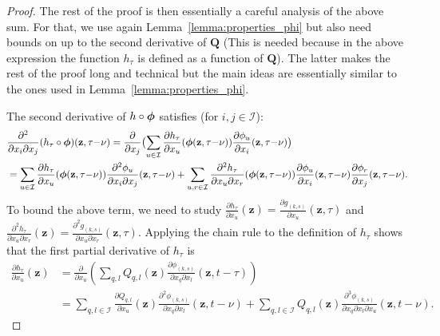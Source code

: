 \documentclass[acmsmall]{acmart}
\newcommand\bz{\mathbf{z}}
\newcommand\bphi{\text{\boldmath$\phi$}}
\newcommand\bQ{\mathbf{Q}}
\newcommand\calI{\mathcal{I}}
\begin{document}
\begin{proof}
The rest of the proof is then essentially a careful analysis of the above sum. For that, we use again Lemma~\ref{lemma:properties_phi} but also need bounds on up to the second derivative of $\bQ$ (This is needed because in the above expression the function $h_\tau$ is defined as a function of $\bQ$).  The latter makes the rest of the proof long and technical but the main ideas are essentially similar to the ones used in Lemma~\ref{lemma:properties_phi}. 

\medskip

The second derivative of $h\circ \bphi$ satisfies (for $i,j\in\calI$):
\begin{align}
& \frac{\partial^2}{\partial x_i \partial x_j} (h_\tau \circ \bphi)(\bz,\tau{-}\nu) = 
\frac{\partial}{\partial x_j} \bigl( \sum_{u \in \calI} \frac{\partial h_\tau}{\partial x_u}(\bphi (\bz, \tau{-}\nu)) \frac{\partial \phi_u}{\partial x_i}(\bz,\tau{-}\nu) \bigr) \nonumber\\
& = \sum_{u \in \calI} \frac{\partial h_\tau}{\partial x_u}(\bphi (\bz, \tau{-}\nu))\frac{\partial^2 \phi_u}{\partial x_i \partial x_j}(\bz,\tau{-}\nu) + \sum_{u, r \in \calI} \frac{\partial^2 h_\tau}{\partial x_u \partial x_r}(\bphi (\bz, \tau{-}\nu)) \frac{\partial \phi_u}{\partial x_i}(\bz,\tau{-}\nu) \frac{\partial \phi_r}{\partial x_j}(\bz,\tau{-}\nu) \label{eq:partial_deriv_g_ks}.
\end{align}
To bound the above term, we need to study $\frac{\partial h_\tau}{\partial x_u}(\bz) = \frac{\partial g_{(k,s)}}{\partial x_u}(\bz,\tau)$ and $\frac{\partial^2 h_\tau}{\partial x_u \partial x_r}(\bz) = \frac{\partial^2 g_{(k,s)}}{\partial x_u \partial x_r}(\bz,\tau)$. Applying the chain rule to the definition of $h_\tau$ shows that the first partial derivative of $h_\tau$ is
\begin{align*}
  \frac{\partial h_\tau}{\partial x_u}(\bz) & = \frac{\partial }{\partial x_u}\left( \sum_{q, l} Q_{q,l}(\bz)\frac{\partial \phi_{(k,s)}}{\partial x_q \partial x_l}(\bz, t{-}\tau) \right)\\
  & = \sum_{q,l \in \calI} \frac{\partial Q_{q,l}}{\partial x_u}(\bz) \frac{\partial^2 \phi_{(k,s)}}{\partial x_q \partial x_l}(\bz,t-\nu) + \sum_{q,l \in \calI} Q_{q,l}(\bz) \frac{\partial^3 \phi_{(k,s)}}{\partial x_q \partial x_l \partial x_u}(\bz,t-\nu).
\end{align*}


\end{proof}
\end{document}
